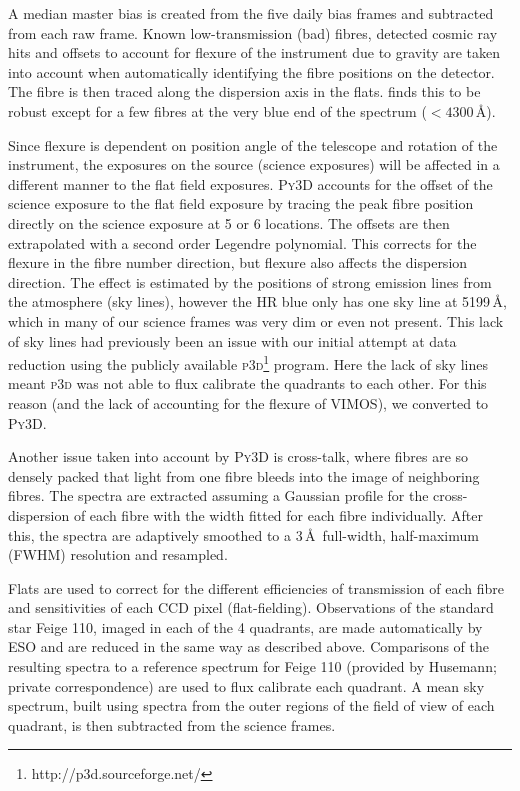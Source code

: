 		A median master bias is created from the five daily bias frames and subtracted from each raw frame. Known low-transmission (bad) fibres, detected cosmic ray hits and offsets to account for flexure of the instrument due to gravity are taken into account when automatically identifying the fibre positions on the detector. The fibre is then traced along the dispersion axis in the flats. \citet{Husemann2014} finds this to be robust except for a few fibres at the very blue end of the spectrum ($<4300$\,\AA). 

		Since flexure is dependent on position angle of the telescope and rotation of the instrument, the exposures on the source (science exposures) will be affected in a different manner to the flat field exposures. \textsc{Py3D} accounts for the offset of the science exposure to the flat field exposure by tracing the peak fibre position directly on the science exposure at 5 or 6 locations. The offsets are then extrapolated with a second order Legendre polynomial. This corrects for the flexure in the fibre number direction, but flexure also affects the dispersion direction. The effect is estimated by the positions of strong emission lines from the atmosphere (sky lines), however the HR blue only has one sky line at 5199\,\AA, which in many of our science frames was very dim or even not present. This lack of sky lines had previously been an issue with our initial attempt at data reduction using the publicly available \textsc{p3d}\footnote{http://p3d.sourceforge.net/} program. Here the lack of sky lines meant \textsc{p3d} was not able to flux calibrate the quadrants to each other. For this reason (and the lack of accounting for the flexure of VIMOS), we converted to \textsc{Py3D}.

		Another issue taken into account by \textsc{Py3D} is cross-talk, where fibres are so densely packed that light from one fibre bleeds into the image of neighboring fibres. The spectra are extracted assuming a Gaussian profile for the cross-dispersion of each fibre with the width fitted for each fibre individually. After this, the spectra are adaptively smoothed to a 3\,\AA\ full-width, half-maximum (FWHM) resolution and resampled.

		Flats are used to correct for the different efficiencies of transmission of each fibre and sensitivities of each CCD pixel (flat-fielding). Observations of the standard star Feige 110, imaged in each of the 4 quadrants, are made automatically by ESO and are reduced in the same way as described above. Comparisons of the resulting spectra to a reference spectrum for Feige 110 (provided by Husemann; private correspondence) are used to flux calibrate each quadrant. A mean sky spectrum, built using spectra from the outer regions of the field of view of each quadrant, is then subtracted from the science frames. 

